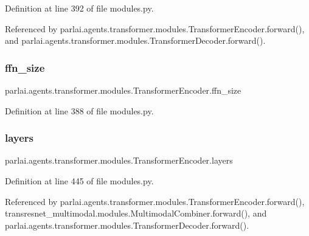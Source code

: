 Definition at line 392 of file modules.\+py.



Referenced by parlai.\+agents.\+transformer.\+modules.\+Transformer\+Encoder.\+forward(), and parlai.\+agents.\+transformer.\+modules.\+Transformer\+Decoder.\+forward().

\mbox{\label{classparlai_1_1agents_1_1transformer_1_1modules_1_1TransformerEncoder_afadc86cb37af464565167dc169447057}} 
\subsubsection{\texorpdfstring{ffn\+\_\+size}{ffn\_size}}
{\footnotesize\ttfamily parlai.\+agents.\+transformer.\+modules.\+Transformer\+Encoder.\+ffn\+\_\+size}



Definition at line 388 of file modules.\+py.

\mbox{\label{classparlai_1_1agents_1_1transformer_1_1modules_1_1TransformerEncoder_acbeff4ac94daff4e1627b6d93cd37424}} 
\subsubsection{\texorpdfstring{layers}{layers}}
{\footnotesize\ttfamily parlai.\+agents.\+transformer.\+modules.\+Transformer\+Encoder.\+layers}



Definition at line 445 of file modules.\+py.



Referenced by parlai.\+agents.\+transformer.\+modules.\+Transformer\+Encoder.\+forward(), transresnet\+\_\+multimodal.\+modules.\+Multimodal\+Combiner.\+forward(), and parlai.\+agents.\+transformer.\+modules.\+Transformer\+Decoder.\+forward().

